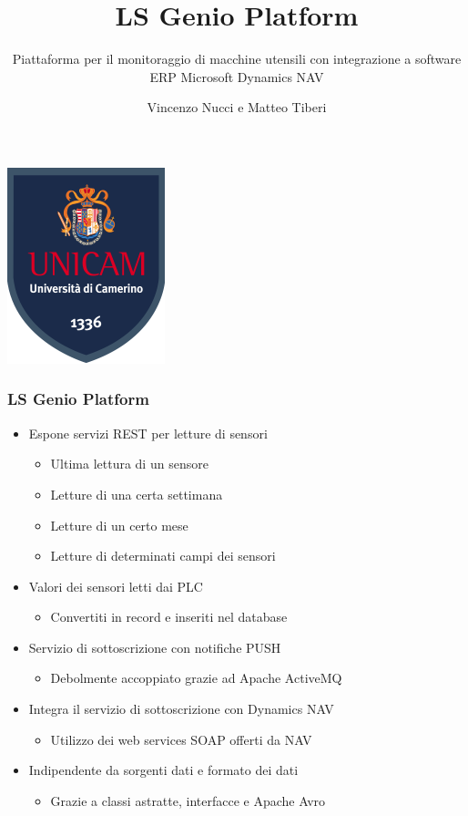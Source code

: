 \documentclass{beamer}
\title{LS Genio Platform}
\subtitle{Piattaforma per il monitoraggio di macchine utensili con integrazione a software ERP Microsoft Dynamics NAV}
\author{Vincenzo Nucci e Matteo Tiberi}
\institute{Università di Camerino}
\date{}
\begin{document}
	
	\begin{frame}
	\centering
	\includegraphics[scale=0.7]{images/stemma.png}\par
\end{frame}


\begin{frame}
\frametitle{LS Genio Platform}
\begin{itemize}
	\item Espone servizi REST per letture di sensori
	\begin{itemize}
		\item Ultima lettura di un sensore
		\item Letture di una certa settimana
		\item Letture di un certo mese
		\item Letture di determinati campi dei sensori
	\end{itemize}
	\item Valori dei sensori letti dai PLC
	\begin{itemize}
		\item Convertiti in record e inseriti nel database
	\end{itemize}
	\item Servizio di sottoscrizione con notifiche PUSH
	\begin{itemize}
		\item Debolmente accoppiato grazie ad Apache ActiveMQ
	\end{itemize}
	\item Integra il servizio di sottoscrizione con Dynamics NAV
	\begin{itemize}
		\item Utilizzo dei web services SOAP offerti da NAV
	\end{itemize}
	\item Indipendente da sorgenti dati e formato dei dati
	\begin{itemize}
		\item Grazie a classi astratte, interfacce e Apache Avro
	\end{itemize}
	
\end{itemize}
\end{frame}
\end{document}
